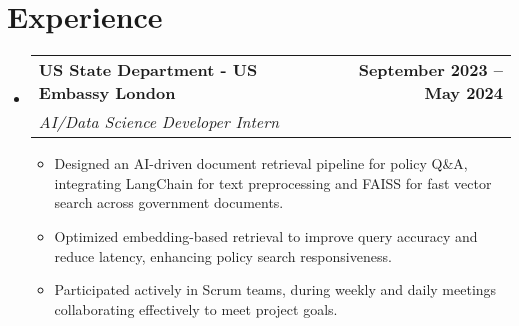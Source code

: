 \documentclass[letterpaper,11pt]{article}
\makeatletter
\newcommand{\resumeItem}[1]{
  \item\small{
    {#1 \vspace{-2pt}}
  }
}
\newcommand{\resumeSubheading}[4]{
  \vspace{-2pt}\item
    \begin{tabular*}{1.0\textwidth}[t]{l@{\extracolsep{\fill}}r}
      \textbf{#1} & \textbf{\small #2} \\
      \textit{\small#3} & \textit{\small #4} \\
    \end{tabular*}\vspace{-7pt}
}
\newcommand{\resumeSubHeadingListStart}{\begin{itemize}[leftmargin=0.0in, label={}]}
\newcommand{\resumeSubHeadingListEnd}{\end{itemize}}
\newcommand{\resumeItemListStart}{\begin{itemize}}
\newcommand{\resumeItemListEnd}{\end{itemize}\vspace{-5pt}}
\makeatother
\begin{document}
\section{Experience}
  \resumeSubHeadingListStart

    \resumeSubheading
      {US State Department - US Embassy London}         {September 2023 -- May 2024}
      {AI/Data Science Developer  Intern} {}
      \resumeItemListStart
        \resumeItem{Designed an AI-driven document retrieval pipeline for policy Q\&A, integrating LangChain for text preprocessing and FAISS for fast vector search across government documents.}
        \resumeItem{Optimized embedding-based retrieval to improve query accuracy and reduce latency, enhancing policy search responsiveness.}
        \resumeItem{Participated actively in Scrum teams, during weekly and daily meetings collaborating effectively to meet project goals.}
      \resumeItemListEnd
  \resumeSubHeadingListEnd
\vspace{-12pt}

\end{document}

